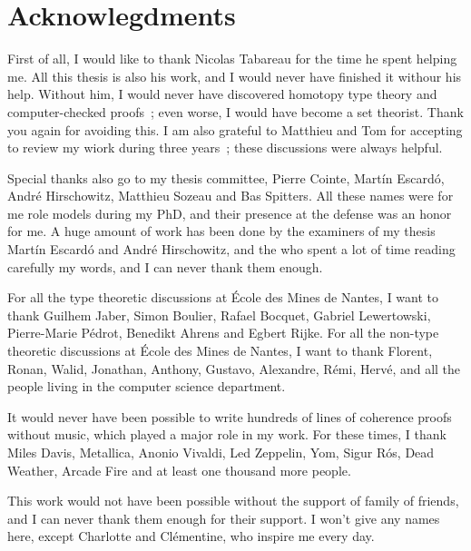 \chapter{Acknowlegdments}

First of all, I would like to thank Nicolas Tabareau for the time he
spent helping me. All this thesis is also his work, and I would never
have finished it withour his help.
Without him, I would never have discovered homotopy type theory and
computer-checked proofs~; even worse, I would have become a set
theorist. Thank you again for avoiding this. 
I am also grateful to Matthieu and Tom for accepting to review my
wiork during three years~; these discussions were always helpful.
\bigskip

Special thanks also go to my thesis committee, Pierre Cointe, Mart\'in
Escard\'o, André Hirschowitz, Matthieu Sozeau and Bas Spitters. All
these names were for me role models during my PhD, and their presence
at the defense was an honor for me.
A huge amount of work has been done by the examiners of my thesis
Mart\'in Escard\'o and André Hirschowitz, and the  who spent a lot of time
reading carefully my words, and I can never thank them enough.

\bigskip

For all the type theoretic discussions at École des Mines de Nantes, I
want to thank Guilhem Jaber, Simon Boulier, Rafael Bocquet, Gabriel
Lewertowski, Pierre-Marie Pédrot, Benedikt Ahrens and
Egbert Rijke. For all the non-type theoretic discussions at École des
Mines de Nantes, I want to thank Florent, Ronan, Walid, Jonathan,
Anthony, Gustavo, Alexandre, Rémi, Hervé, and all the people living in
the computer science department.

\bigskip

It would never have been possible to write hundreds of lines of coherence
proofs without music, which played a major role in my work. For these
times, I thank Miles Davis, Metallica, Anonio Vivaldi, Led Zeppelin,
Yom, Sigur R\'os, Dead Weather, Arcade Fire and at least one thousand
more people. 

\bigskip

This work would not have been possible without the support of family
of friends, and I can never thank them enough for their support. I
won't give any names here, except Charlotte and Clémentine, who
inspire me every day.


